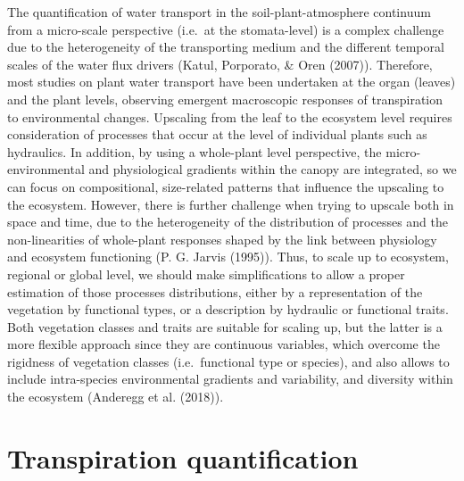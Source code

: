 \documentclass[11pt,twoside]{reedthesis}
\begin{document}
The quantification of water transport in the soil-plant-atmosphere
continuum from a micro-scale perspective (i.e.~at the stomata-level) is
a complex challenge due to the heterogeneity of the transporting medium
and the different temporal scales of the water flux drivers (Katul,
Porporato, \& Oren (2007)). Therefore, most studies on plant water
transport have been undertaken at the organ (leaves) and the plant
levels, observing emergent macroscopic responses of transpiration to
environmental changes. Upscaling from the leaf to the ecosystem level
requires consideration of processes that occur at the level of
individual plants such as hydraulics. In addition, by using a
whole-plant level perspective, the micro-environmental and physiological
gradients within the canopy are integrated, so we can focus on
compositional, size-related patterns that influence the upscaling to the
ecosystem. However, there is further challenge when trying to upscale
both in space and time, due to the heterogeneity of the distribution of
processes and the non-linearities of whole-plant responses shaped by the
link between physiology and ecosystem functioning (P. G. Jarvis (1995)).
Thus, to scale up to ecosystem, regional or global level, we should make
simplifications to allow a proper estimation of those processes
distributions, either by a representation of the vegetation by
functional types, or a description by hydraulic or functional traits.
Both vegetation classes and traits are suitable for scaling up, but the
latter is a more flexible approach since they are continuous variables,
which overcome the rigidness of vegetation classes (i.e.~functional type
or species), and also allows to include intra-species environmental
gradients and variability, and diversity within the ecosystem (Anderegg
et al. (2018)).\par

\section{Transpiration
quantification}\label{transpiration-quantification}
\end{document}
